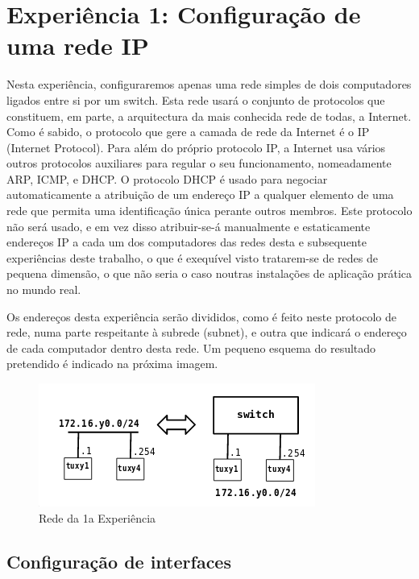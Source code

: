 \documentclass[a4paper,11pt,titlepage]{article}
\begin{document}
\section{Experiência 1: Configuração de uma rede IP }

Nesta experiência, configuraremos apenas uma rede simples de dois computadores
ligados entre si por um switch. Esta rede usará o conjunto de protocolos que
constituem, em parte, a arquitectura da mais conhecida rede de todas, a
Internet. Como é sabido, o protocolo que gere a camada de rede da Internet é
o IP (Internet Protocol).  Para além do próprio protocolo IP, a Internet usa
vários outros protocolos auxiliares para regular o seu funcionamento,
nomeadamente ARP, ICMP, e DHCP.
O protocolo DHCP é usado para negociar automaticamente a atribuição de um
endereço IP a qualquer elemento de uma rede que permita uma identificação única
perante outros membros. Este protocolo não será usado, e em vez disso
atribuir-se-á manualmente e estaticamente endereços IP a cada um dos
computadores das redes desta e subsequente experiências deste trabalho, o que é
exequível visto tratarem-se de redes de pequena dimensão, o que não seria o
caso noutras instalações de aplicação prática no mundo real.

Os endereços desta experiência serão divididos, como é feito neste protocolo de
rede, numa parte respeitante à subrede (subnet), e outra que indicará o
endereço de cada computador dentro desta rede. Um pequeno esquema do resultado
pretendido é indicado na próxima imagem.

\begin{figure}[H]
    \center
    \includegraphics[scale=0.45]{res/network1.png}
    \caption{Rede da 1a Experiência}
    \label{fig:network1.png}
\end{figure}

\subsection*{Configuração de interfaces}
\end{document}

